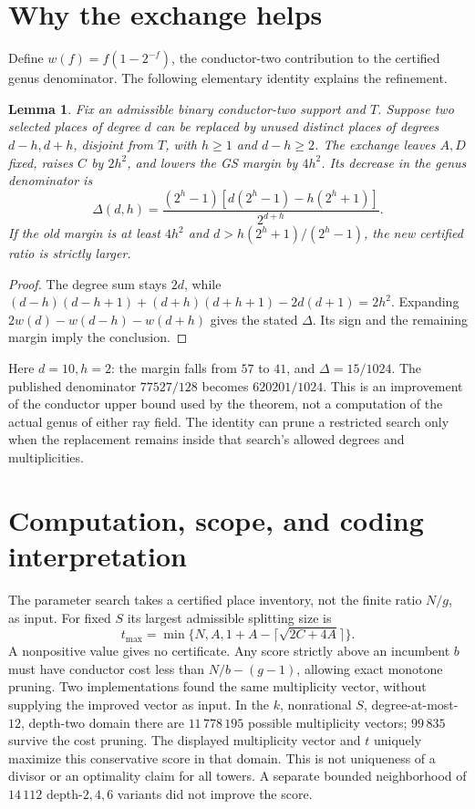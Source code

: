 \documentclass[11pt]{article}
\newtheorem{lemma}[theorem]{Lemma}
\begin{document}
\section{Why the exchange helps}
Define $w(f)=f(1-2^{-f})$, the conductor-two contribution to the certified
genus denominator. The following elementary identity explains the refinement.
\begin{lemma}
Fix an admissible binary conductor-two support and $T$. Suppose two selected
places of degree $d$ can be replaced by unused distinct places of degrees
$d-h,d+h$, disjoint from $T$, with $h\ge1$ and $d-h\ge2$.
The exchange leaves $A,D$ fixed, raises $C$ by $2h^2$, and lowers the GS
margin by $4h^2$. Its decrease in the genus denominator is
\[
 \Delta(d,h)=\frac{(2^h-1)[d(2^h-1)-h(2^h+1)]}{2^{d+h}}.
\]
If the old margin is at least $4h^2$ and
$d>h(2^h+1)/(2^h-1)$, the new certified ratio is strictly larger.
\end{lemma}
\begin{proof}
The degree sum stays $2d$, while
$(d-h)(d-h+1)+(d+h)(d+h+1)-2d(d+1)=2h^2$.
Expanding $2w(d)-w(d-h)-w(d+h)$ gives the stated $\Delta$.
Its sign and the remaining margin imply the conclusion.
\end{proof}
Here $d=10,h=2$: the margin falls from $57$ to $41$, and
$\Delta=15/1024$. The published denominator $77527/128$ becomes
$620201/1024$. This is an improvement of the conductor upper bound used by
the theorem, not a computation of the actual genus of either ray field.
The identity can prune a restricted search only when the replacement remains
inside that search's allowed degrees and multiplicities.

\section{Computation, scope, and coding interpretation}
The parameter search takes a certified place inventory, not the finite ratio
$N/g$, as input. For fixed $S$ its largest admissible splitting size is
\[
 t_{\max}=\min\{N,A,1+A-\lceil\sqrt{2C+4A}\rceil\}.
\]
A nonpositive value gives no certificate. Any score strictly above an incumbent
$b$ must have conductor cost less than $N/b-(g-1)$, allowing exact monotone
pruning. Two implementations found the same multiplicity vector, without
supplying the improved vector as input. In the $k$, nonrational $S$,
degree-at-most-$12$, depth-two domain there are $11\,778\,195$ possible
multiplicity vectors; $99\,835$ survive the cost pruning. The displayed
multiplicity vector and $t$ uniquely maximize this conservative score in
that domain. This is not uniqueness of a divisor or an optimality claim for
all towers. A separate bounded neighborhood of $14\,112$ depth-$2,4,6$
variants did not improve the score.
\end{document}

